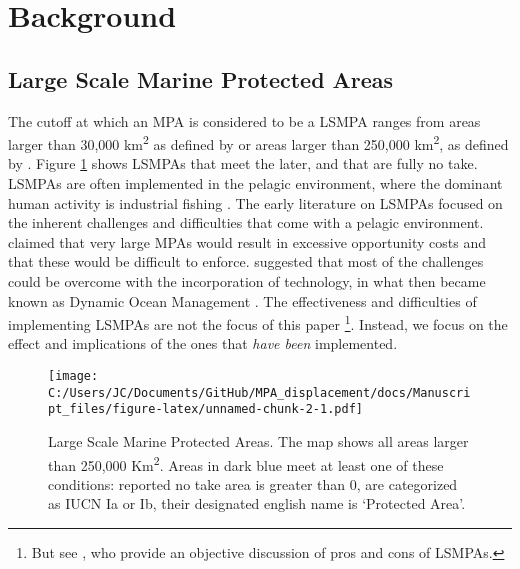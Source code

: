 \documentclass[11pt,]{article}
\let\rmarkdownfootnote\footnote%
\def\footnote{\protect\rmarkdownfootnote}
\begin{document}
\hypertarget{background}{%
\section{Background}\label{background}}

\hypertarget{large-scale-marine-protected-areas}{%
\subsection{Large Scale Marine Protected
Areas}\label{large-scale-marine-protected-areas}}

The cutoff at which an MPA is considered to be a LSMPA ranges from areas
larger than 30,000 km\textsuperscript{2} as defined by
\citet{desanto_2013} or areas larger than 250,000 km\textsuperscript{2},
as defined by \citep{toonen_2013}. Figure \ref{fig:LSMPAs_map} shows
LSMPAs that meet the later, and that are fully no take. LSMPAs are often
implemented in the pelagic environment, where the dominant human
activity is industrial fishing \citep{gray_2017,kroodsma_2018}. The
early literature on LSMPAs focused on the inherent challenges and
difficulties that come with a pelagic environment. \citet{kaplan_2010}
claimed that very large MPAs would result in excessive opportunity costs
and that these would be difficult to enforce. \citet{game_2009}
suggested that most of the challenges could be overcome with the
incorporation of technology, in what then became known as Dynamic Ocean
Management \citep{maxwell_2015}. The effectiveness and difficulties of
implementing LSMPAs are not the focus of this paper
\footnote{But see \citet{singleton_2014}, who provide an objective discussion of pros and cons of LSMPAs.}.
Instead, we focus on the effect and implications of the ones that
\emph{have been} implemented.

\begin{figure}
\centering
\texttt{[image: C:/Users/JC/Documents/GitHub/MPA\_displacement/docs/Manuscript\_files/figure-latex/unnamed-chunk-2-1.pdf]}
\caption{\label{fig:unnamed-chunk-2}\label{fig:LSMPAs_map}Large Scale Marine
Protected Areas. The map shows all areas larger than 250,000
Km\textsuperscript{2}. Areas in dark blue meet at least one of these
conditions: reported no take area is greater than 0, are categorized as
IUCN Ia or Ib, their designated english name is `Protected Area'.}
\end{figure}
\end{document}
